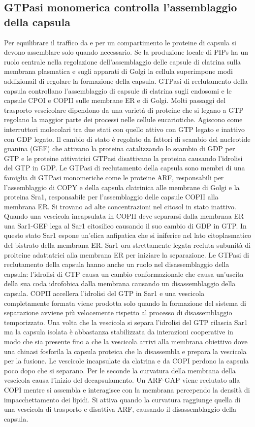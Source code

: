 \subsection{GTPasi monomerica controlla l'assemblaggio della capsula}
Per equilibrare il traffico da e per un compartimento le proteine di capsula si devono assemblare solo quando necessario. Se la produzione locale di PIPs ha un ruolo centrale nella
regolazione dell'assemblaggio delle capsule di clatrina sulla membrana plasmatica e sugli apparati di Golgi la cellula superimpone modi addizionail di regolare la formazione della
capsula. GTPasi di reclutamento della capsula controllano l'assemblaggio di capsule di clatrina sugli endosomi e le capsule CPOI e COPII sulle membrane ER e di Golgi. Molti passaggi
del trasporto vescicolare dipendono da una variet\`a di proteine che si legano a GTP regolano la maggior parte dei processi nelle cellule eucariotiche. Agiscono come interruttori 
molecolari tra due stati con quello attivo con GTP legato e inattivo con GDP legato. Il cambio di stato \`e regolato da fattori di scambio del nucleotide guanina (GEF) che attivano la
proteina catalizzando lo scambio di GDP per GTP e le proteine attivatrici GTPasi disattivano la proteina causando l'idrolisi del GTP in GDP. Le GTPasi di reclutamento della capsula
sono membri di una famiglia di GTPasi monomeriche come le proteine ARF, responsabili per l'assemblaggio di COPY e della capsula clatrinica alle membrane di Golgi e la proteina Sra1, 
responsabile per l'assemblaggio delle capsule COPII alla membrana ER. Si trovano ad alte concentrazioni nel citosol in stato inattivo. Quando una vescicola incapsulata in COPII deve
separarsi dalla membrnaa ER una Sar1-GEF lega al Sar1 citosilico causando il suo cambio di GDP in GTP. In questo stato Sar1 espone un'elica anfipatica che si iniferice nel lato
citoplasmatico del bistrato della membrana ER. Sar1 ora strettamente legata recluta subunit\`a di proiteine adattatrici alla membrana ER per iniziare la separazione. Le GTPasi
di reclutamento della capsula hanno anche un ruolo nel disassemblaggio della capsula: l'idrolisi di GTP causa un cambio conformazionale che causa un'uscita della sua coda idrofobica
dalla membrana causando un disassemblaggio della capsula. COPII accellera l'idrolisi del GTP in Sar1 e una vescicola completamente formata viene prodotta solo quando la formazione
del sistema di separazione avviene pi\`u velocemente rispetto al processo di disassemblaggio temporizzato. Una volta che la vescicola si separa l'idrolisi del GTP rilascia Sar1 ma
la capsula isolata \`e abbastanza stabilizzata da interazioni cooperative in modo che sia presente fino a che la vescicola arrivi alla membrana obiettivo dove una chinasi fosforila
la capsula proteica che la disassembla e prepara la vescicola per la fusione. Le vescicole incapsulate da clatrina e da COPI perdono la capsula poco dopo che si separano. Per le seconde
la curvatura della membrana della vescicola causa l'inizio del decapsulamento. Un ARF-GAP viene reclutato alla COPI mentre si assembla e interagisce con la membrana percependo 
la densit\`a di impacchettamento dei lipidi. Si attiva quando la curvatura raggiunge quella di una vescicola di trasporto e disattiva ARF, causando il disassemblaggio della capsula.
